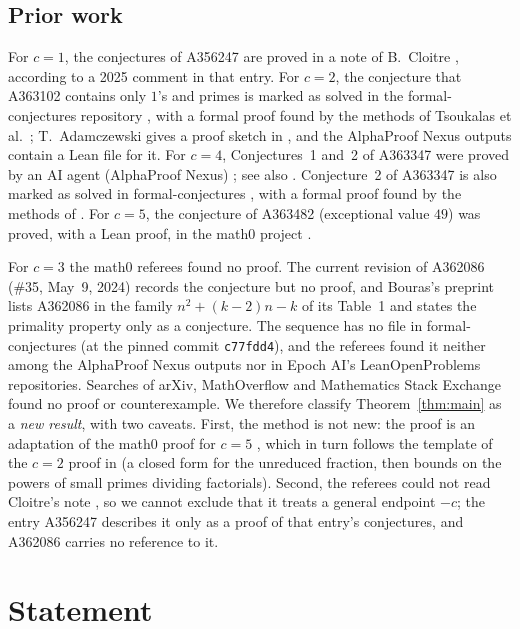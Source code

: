 \documentclass[11pt]{amsart}
\theoremstyle{plain}
\theoremstyle{definition}
\begin{document}
\subsection*{Prior work}
For $c=1$, the conjectures of A356247 are proved in a note of B.~Cloitre \cite{Cloitre}, according to a 2025 comment in that entry.
For $c=2$, the conjecture that A363102 contains only $1$'s and primes is marked as solved in the formal-conjectures repository \cite{FC}, with a formal proof found by the methods of Tsoukalas et al.\ \cite{Tsoukalas}; T.~Adamczewski gives a proof sketch in \cite[Appendix~A]{Ad}, and the AlphaProof Nexus outputs \cite{APN} contain a Lean file for it.
For $c=4$, Conjectures~1 and~2 of A363347 were proved by an AI agent (AlphaProof Nexus) \cite{APN}; see also \cite[Appendix~A]{Ad}. Conjecture~2 of A363347 is also marked as solved in formal-conjectures \cite{FC}, with a formal proof found by the methods of \cite{Tsoukalas}.
For $c=5$, the conjecture of A363482 (exceptional value $49$) was proved, with a Lean proof, in the math0 project \cite{M0A363482}.

For $c=3$ the math0 referees found no proof. The current revision of A362086 (\#35, May~9, 2024) records the conjecture but no proof, and Bouras's preprint \cite{Barxiv} lists A362086 in the family $n^2+(k-2)n-k$ of its Table~1 and states the primality property only as a conjecture. The sequence has no file in formal-conjectures \cite{FC} (at the pinned commit \texttt{c77fdd4}), and the referees found it neither among the AlphaProof Nexus outputs \cite{APN} nor in Epoch AI's LeanOpenProblems repositories. Searches of arXiv, MathOverflow and Mathematics Stack Exchange found no proof or counterexample.
We therefore classify Theorem~\ref{thm:main} as a \emph{new result}, with two caveats. First, the method is not new: the proof is an adaptation of the math0 proof for $c=5$ \cite{M0A363482}, which in turn follows the template of the $c=2$ proof in \cite[Appendix~A]{Ad} (a closed form for the unreduced fraction, then bounds on the powers of small primes dividing factorials). Second, the referees could not read Cloitre's note \cite{Cloitre}, so we cannot exclude that it treats a general endpoint $-c$; the entry A356247 describes it only as a proof of that entry's conjectures, and A362086 carries no reference to it.

\section{Statement}\label{sec:statement}
\end{document}
